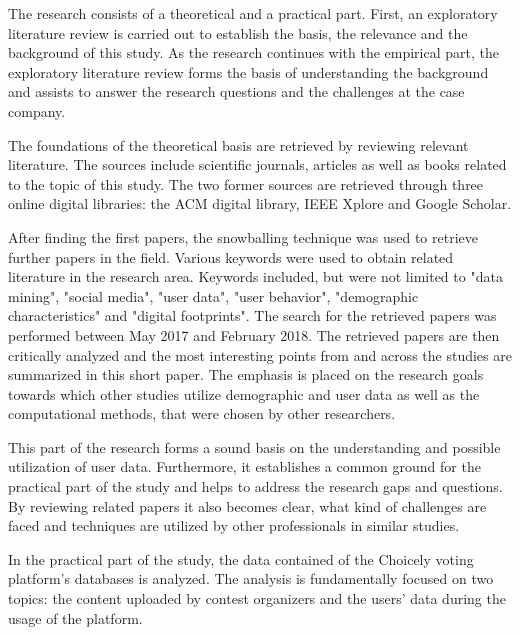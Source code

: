 The research consists of a theoretical and a practical part. First, an exploratory literature review is carried out to establish the basis, the relevance and the background of this study. As the research continues with the empirical part, the exploratory literature review forms the basis of understanding the background and assists to answer the research questions and the challenges at the case company. 

The foundations of the theoretical basis are retrieved by reviewing relevant literature. The sources include scientific journals, articles as well as books related to the topic of this study. The two former sources are retrieved through three online digital libraries: the ACM digital library, IEEE Xplore and Google Scholar. 

After finding the first papers, the snowballing technique was used to retrieve further papers in the field. Various keywords were used to obtain related literature in the research area. Keywords included, but were not limited to "data mining", "social media", "user data", "user behavior", "demographic characteristics" and "digital footprints". The search for the retrieved papers was performed between May 2017 and February 2018. The retrieved papers are then critically analyzed and the most interesting points from and across the studies are summarized in this short paper. The emphasis is placed on the research goals towards which other studies utilize demographic and user data as well as the computational methods, that were chosen by other researchers. 

This part of the research forms a sound basis on the understanding and possible utilization of user data. Furthermore, it establishes a common ground for the practical part of the study and helps to address the research gaps and questions. By reviewing related papers it also becomes clear, what kind of challenges are faced and techniques are utilized by other professionals in similar studies.

In the practical part of the study, the data contained of the Choicely voting platform's databases is analyzed. The analysis is fundamentally focused on two topics: the content uploaded by contest organizers and the users' data during the usage of the platform. 


